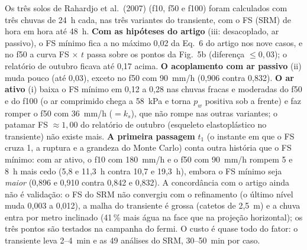 Os três solos de Rahardjo et al.\ (2007) (f10, f50 e f100) foram calculados com três chuvas de 24~h cada, nas três
variantes do transiente, com o FS (SRM) de hora em hora até 48~h. \textbf{Com as hipóteses do artigo} (iii:
desacoplado, ar passivo), o FS mínimo fica a no máximo 0,02 da Eq.~6 do artigo nos nove casos, e no f50 a curva
FS $\times$ $t$ passa sobre os pontos da Fig.~5b (diferença $\le 0{,}03$); o relatório de outubro ficava até 0,17
acima. \textbf{O acoplamento com ar passivo} (ii) muda pouco (até 0,03), exceto no f50 com 90~mm/h (0,906 contra
0,832). \textbf{O ar ativo} (i) baixa o FS mínimo em 0,12 a 0,28 nas chuvas fracas e moderadas do f50 e do f100 (o ar
comprimido chega a 58~kPa e torna $p_w$ positiva sob a frente) e faz romper o f50 com 36~mm/h ($= k_s$), que não rompe
nas outras variantes; o patamar FS $\approx 1{,}00$ do relatório de outubro (esqueleto elastoplástico no transiente)
não existe mais. \textbf{A primeira passagem} $t_1$ (o instante em que o FS cruza 1, a ruptura e a grandeza do Monte
Carlo) conta outra história que o FS mínimo: com ar ativo, o f10 com 180~mm/h e o f50 com 90~mm/h rompem 5 e 8~h mais
cedo (5,8 e 11,3~h contra 10,7 e 19,3~h), embora o FS mínimo seja \emph{maior} (0,896 e 0,910 contra 0,842 e 0,832).
A concordância com o artigo ainda não é validação: o FS do SRM não convergiu com o refinamento (o último nível muda
0,003 a 0,012), a malha do transiente é grossa (catetos de 2,5~m) e a chuva entra por metro inclinado (41\,\% mais água
na face que na projeção horizontal); os três pontos são testados na campanha do fermi. O custo é quase todo do fator:
o transiente leva 2--4~min e as 49 análises do SRM, 30--50~min por caso.
